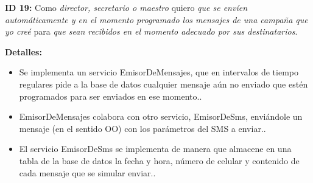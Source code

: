 \documentclass[a4paper, 10pt, twoside]{article}
\newcommand{\sprintstory}[4]{
  \noindent
  \textbf{ID #1:} Como \emph{#2} quiero \emph{#3} para \emph{#4}.
}
\newenvironment{detalles}{
  \textbf{Detalles:}
  \begin{itemize}
}{
  \end{itemize}
}
\newcommand{\detalle}[1] {
  \item #1.
}
\newenvironment{criterios}{
  \textbf{Criterio de aceptación:}
  \begin{itemize}
}{
  \end{itemize}
}
\newcommand{\criterio}[1] {
  \item #1
}
\newenvironment{tasks}{
  \textbf{Tareas:}
  \begin{enumerate}
}{
  \end{enumerate}
}
\newcommand{\task}[2] {
  \item #1.\\
  \emph{Estimación (hs): #2}
}
\begin{document}
%
%
%
%
%
%

\sprintstory{19}
            {director, secretario o maestro}
            {que se envíen automáticamente y en el momento programado los mensajes de una campaña que yo creé}
            {que sean recibidos en el momento adecuado por sus destinatarios}

\begin{detalles}
  \detalle{Se implementa un servicio EmisorDeMensajes, que en intervalos de tiempo regulares pide a la base de datos cualquier mensaje aún no enviado que estén programados para ser enviados en ese momento.}
  \detalle{EmisorDeMensajes colabora con otro servicio, EmisorDeSms, enviándole un mensaje (en el sentido OO) con los parámetros del SMS a enviar.}
  \detalle{El servicio EmisorDeSms se implementa de manera que almacene en una tabla de la base de datos la fecha y hora, número de celular y contenido de cada mensaje que se simular enviar.}
\end{detalles}
\end{document}
